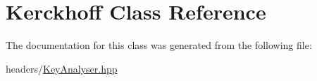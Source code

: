 \hypertarget{classKerckhoff}{}\section{Kerckhoff Class Reference}
\label{classKerckhoff}


The documentation for this class was generated from the following file\+:\begin{DoxyCompactItemize}
\item 
headers/\hyperlink{KeyAnalyser_8hpp}{Key\+Analyser.\+hpp}\end{DoxyCompactItemize}
